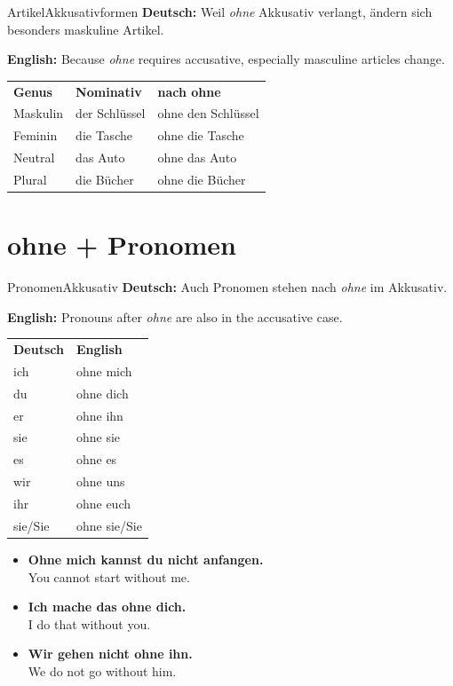 \documentclass[a4paper,11pt]{article}
\newcommand{\GermanText}[1]{\textbf{Deutsch: }#1\par}
\newcommand{\EnglishText}[1]{{\small\color{SoftGray}\textbf{English: }#1\par}}
\newcommand{\ExampleItem}[2]{\item \textbf{#1}\\{\small\color{SoftGray}#2}}
\begin{document}
\begin{grammarentry}{Artikel}{Akkusativformen}
\GermanText{Weil \textit{ohne} Akkusativ verlangt, ändern sich besonders maskuline Artikel.}
\EnglishText{Because \textit{ohne} requires accusative, especially masculine articles change.}

\begin{center}
\begin{tabular}{lll}
\textbf{Genus} & \textbf{Nominativ} & \textbf{nach ohne} \\
Maskulin & der Schlüssel & ohne den Schlüssel \\
Feminin & die Tasche & ohne die Tasche \\
Neutral & das Auto & ohne das Auto \\
Plural & die Bücher & ohne die Bücher \\
\end{tabular}
\end{center}
\end{grammarentry}

\section{ohne + Pronomen}

\begin{grammarentry}{Pronomen}{Akkusativ}
\GermanText{Auch Pronomen stehen nach \textit{ohne} im Akkusativ.}
\EnglishText{Pronouns after \textit{ohne} are also in the accusative case.}

\begin{center}
\begin{tabular}{ll}
\textbf{Deutsch} & \textbf{English} \\
ich & ohne mich \\
du & ohne dich \\
er & ohne ihn \\
sie & ohne sie \\
es & ohne es \\
wir & ohne uns \\
ihr & ohne euch \\
sie/Sie & ohne sie/Sie \\
\end{tabular}
\end{center}

\begin{exbox}
\begin{itemize}
    \ExampleItem{Ohne mich kannst du nicht anfangen.}{You cannot start without me.}
    \ExampleItem{Ich mache das ohne dich.}{I do that without you.}
    \ExampleItem{Wir gehen nicht ohne ihn.}{We do not go without him.}
\end{itemize}
\end{exbox}
\end{grammarentry}
\end{document}
